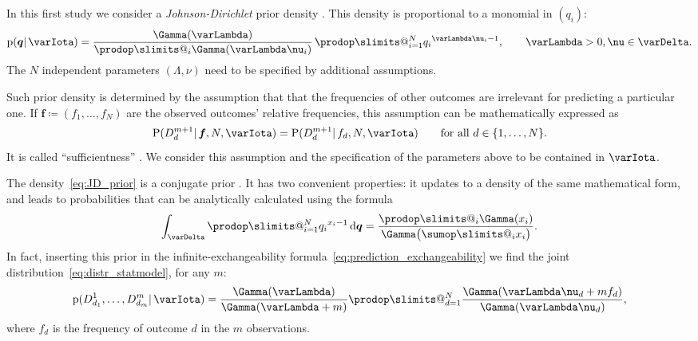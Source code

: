 \documentclass[\ifafour a4paper,12pt,\else a5paper,10pt,\fi%
onecolumn,oneside,article,%
british%
]{memoir}
\makeatletter
\theoremstyle{remark}
\theoremstyle{innote}
\def\sum{\DOTSI\sumop\slimits@}
\def\prod{\DOTSI\prodop\slimits@}
\let\parentext=\parentexttrack%
\newcommand*{\citep}{\parencites}
\newcommand*{\citey}{\parencites*}
\renewcommand*{\cites}{\parencites}
\newcommand*{\di}{\mathrm{d}}%
\newcommand*{\defd}{\coloneqq}
\DeclarePairedDelimiter\set{\{}{\}}
\newcommand*{\pf}{\mathrm{p}}%
\newcommand*{\p}{\mathrm{P}}%
\renewcommand*{\|}{\mathpunct{|}}
\newcommand*{\chap}{ch.}%
\newcommand*{\tsum}{\mathop{\textstyle\sum}\nolimits}
\newcommand*{\simpl}{\varDelta}
\newcommand*{\yqq}{q}
\newcommand*{\yq}{\bm{\yqq}}
\newcommand*{\yff}{f}
\newcommand*{\yf}{\bm{\yff}}
\newcommand*{\yI}{\varIota}
\newcommand*{\yMJ}{\yI}
\newcommand*{\yN}{\varLambda}
\newcommand*{\ynn}{\nu}
\makeatother
\begin{document}
In this first study we consider a \emph{Johnson-Dirichlet} prior density
\parentext{references below}. This density is proportional to a monomial
in $(\yqq_i)$:
\begin{equation}
  \label{eq:JD_prior}
  \pf(\yq \| \yMJ) =
  \frac{\Gamma(\yN)}{\prod_i \Gamma(\yN\ynn_i)}\,
  \prod_{i=1}^N{\yqq_i}^{\yN\ynn_i-1}, \qquad \yN>0, \ynn \in \simpl.
\end{equation}
The $N$ independent parameters $(\yN, \ynn)$ need to be specified by
additional assumptions.

Such prior density is determined by the assumption that that the
frequencies of other outcomes are irrelevant for predicting a particular
one. If $\yf \defd (\yff_{1},\dotsc,\yff_{N})$ are the observed
outcomes' relative frequencies, this assumption can be mathematically
expressed as
\begin{equation}
  \label{eq:sufficientness}
  \p(D^{m+1}_d \| \yf, N, \yMJ) =
  \p(D^{m+1}_{d} \| \yff_{d}, N, \yMJ)
  \qquad\text{for all } d\in\set{1,\dotsc, N}.
\end{equation}
It is called \enquote{sufficientness}
\cites{johnson1924,johnson1932c}[\chap~4]{good1965}{zabell1982,jaynes1986d_r1996}.
We consider this assumption and the specification of the parameters above
to be contained in $\yI$.


The density~\eqref{eq:JD_prior} is a conjugate prior
\cites[\chap~9]{degroot1970_r2004}{diaconisetal1979b}. It has two
convenient properties: it updates to a density of the same mathematical
form, and leads to probabilities that can be analytically calculated using
the formula
\begin{equation}
  \label{eq:Dirichlet_formula}
  \int_{\simpl} \prod_{i=1}^N {\yqq_{i}}^{x_i-1}\,\di\yq = \frac{\prod_i \Gamma(x_i)}{\Gamma\bigl(\sum_i x_i\bigr)}.
\end{equation}
In fact, inserting this prior in the infinite-exchangeability
formula~\eqref{eq:prediction_exchangeability} we find the joint
distribution~\eqref{eq:distr_statmodel}, for any $m$:
\begin{equation}
  \label{eq:joint_distr_JD}
\pf( D^1_{d_1}, \dotsc, D^m_{d_m} \| \yMJ) =
  \frac{\Gamma(\yN)}{\Gamma(\yN+m)}
  \prod_{d=1}^{N}\frac{\Gamma(\yN\ynn_d + m\yff_d)}{\Gamma(\yN\ynn_d)},
\end{equation}
where $\yff_d$ is the frequency of outcome $d$ in the $m$ observations.
\end{document}
